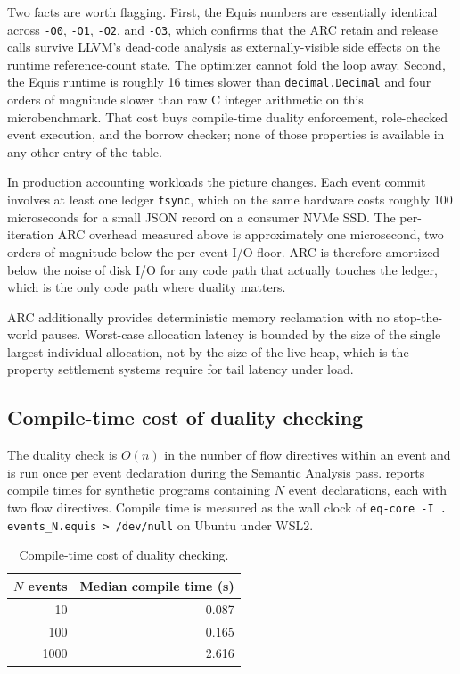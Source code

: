 \documentclass[11pt,a4paper]{article}
\theoremstyle{remark}
\begin{document}
Two facts are worth flagging. First, the Equis numbers are essentially
identical across \texttt{-O0}, \texttt{-O1}, \texttt{-O2}, and
\texttt{-O3}, which confirms that the ARC retain and release calls
survive LLVM's dead-code analysis as externally-visible side effects on
the runtime reference-count state. The optimizer cannot fold the loop
away. Second, the Equis runtime is roughly 16 times slower than
\texttt{decimal.Decimal} and four orders of magnitude slower than raw
C integer arithmetic on this microbenchmark. That cost buys
compile-time duality enforcement, role-checked event execution, and the
borrow checker; none of those properties is available in any other
entry of the table.

In production accounting workloads the picture changes. Each event
commit involves at least one ledger \texttt{fsync}, which on the same
hardware costs roughly 100 microseconds for a small JSON record on a
consumer NVMe SSD. The per-iteration ARC overhead measured above is
approximately one microsecond, two orders of magnitude below the
per-event I/O floor. ARC is therefore amortized below the noise of
disk I/O for any code path that actually touches the ledger, which is
the only code path where duality matters.

ARC additionally provides deterministic memory reclamation with no
stop-the-world pauses. Worst-case allocation latency is bounded by the
size of the single largest individual allocation, not by the size of
the live heap, which is the property settlement systems require for
tail latency under load.

\subsection{Compile-time cost of duality checking}

The duality check is $O(n)$ in the number of flow directives within an
event and is run once per event declaration during the Semantic
Analysis pass.  reports compile times for synthetic
programs containing $N$ event declarations, each with two flow
directives. Compile time is measured as the wall clock of
\texttt{eq-core -I . events\_N.equis > /dev/null} on Ubuntu under WSL2.

\begin{table}[ht]
\caption{Compile-time cost of duality checking.}
\label{tab:compile}
\centering
\small
\begin{tabular}{@{}rr@{}}
\toprule
$N$ events & Median compile time (s) \\
\midrule
   10 & 0.087 \\
  100 & 0.165 \\
 1000 & 2.616 \\
\bottomrule
\end{tabular}
\end{table}
\end{document}
